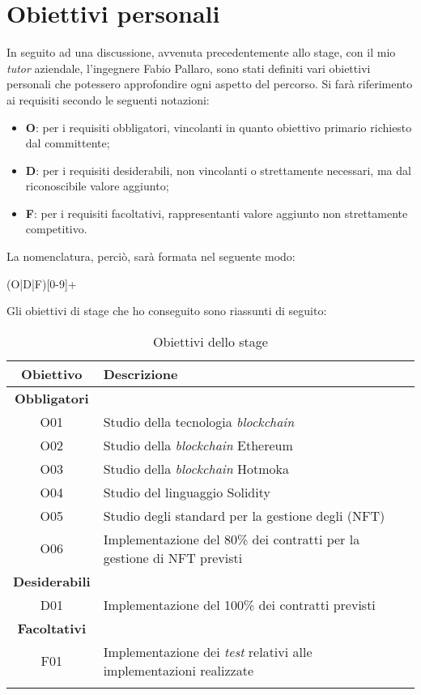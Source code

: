 \section{Obiettivi personali}
In seguito ad una discussione, avvenuta precedentemente allo stage, con il mio \emph{tutor} aziendale, l'ingegnere Fabio Pallaro, sono stati definiti vari obiettivi personali che potessero approfondire ogni aspetto del percorso. Si farà riferimento ai requisiti secondo le seguenti notazioni:
\begin{itemize}
  \item \textbf{O}: per i requisiti obbligatori, vincolanti in quanto obiettivo primario richiesto dal committente;
  \item \textbf{D}: per i requisiti desiderabili, non vincolanti o strettamente necessari, ma dal riconoscibile valore aggiunto;
  \item \textbf{F}: per i requisiti facoltativi, rappresentanti valore aggiunto non strettamente competitivo.
\end{itemize}

\noindent La nomenclatura, perciò, sarà formata nel seguente modo:
\begin{center}
  (O|D|F)[0-9]+
\end{center}

\noindent Gli obiettivi di stage che ho conseguito sono riassunti di seguito:
\begin{longtable}{|c|l|}  
  \hline

  \textbf{Obiettivo} & \textbf{Descrizione} \\ \hline

  \textbf{Obbligatori} & \\

  O01       & Studio della tecnologia \emph{blockchain} \\
  O02       & Studio della \emph{blockchain} Ethereum \\
  O03       & Studio della \emph{blockchain} Hotmoka \\ 
  O04       & Studio del linguaggio Solidity \\ 
  O05       & Studio degli standard per la gestione degli (NFT) \\ 
  O06       & Implementazione del 80\% dei contratti per la gestione di NFT previsti \\
  
  \hline

  \textbf{Desiderabili} &  \\
  
  D01       & Implementazione del 100\% dei contratti previsti \\

  \hline

  \textbf{Facoltativi} & \\

  F01       & Implementazione dei \emph{test} relativi alle implementazioni realizzate \\

  \hline

  \caption{Obiettivi dello stage}

\end{longtable}

